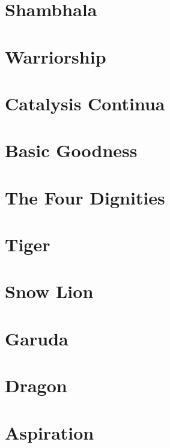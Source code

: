 \documentclass[12pt]{memoir}
\begin{document}
\mainmatter

\chapter{Shambhala}

\chapter{Warriorship}

\chapter{Catalysis Continua}

\chapter{Basic Goodness}

\chapter{The Four Dignities}

\chapter{Tiger}

\chapter{Snow Lion}

\chapter{Garuda}

\chapter{Dragon}

\chapter{Aspiration}
\end{document}

